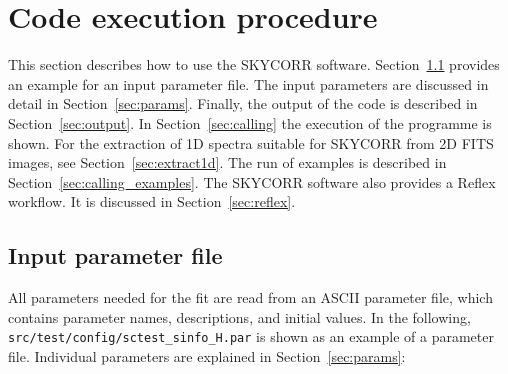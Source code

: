 \section{Code execution procedure}\label{sec:running}
This section describes how to use the SKYCORR software.
Section~\ref{sec:paramfile} provides an example for an input parameter file.
The input parameters are discussed in detail in Section~\ref{sec:params}.
Finally, the output of the code is described in Section~\ref{sec:output}. In
Section~\ref{sec:calling} the execution of the programme is shown. For the
extraction of 1D spectra suitable for SKYCORR from 2D FITS images, see
Section~\ref{sec:extract1d}. The run of examples is described in
Section~\ref{sec:calling_examples}. The SKYCORR software also provides a Reflex
workflow. It is discussed in Section~\ref{sec:reflex}.

\subsection{Input parameter file}\label{sec:paramfile}
All parameters needed for the fit are read from an ASCII parameter file, which
contains parameter names, descriptions, and initial values. In the following,
{\tt src/test/config/sctest\_sinfo\_H.par} is shown as an example of a
parameter file. Individual parameters are explained in
Section~\ref{sec:params}:

